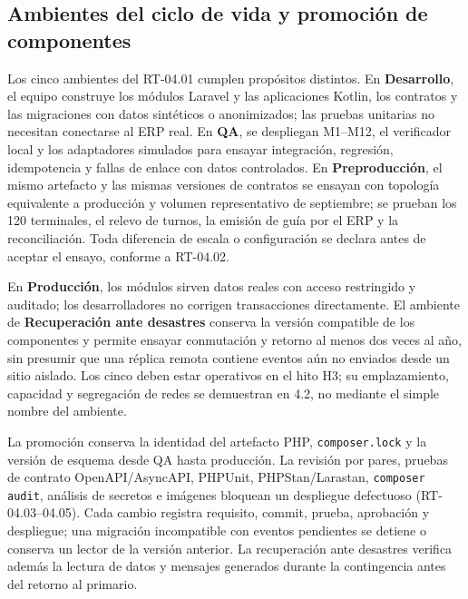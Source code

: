 \subsection{Ambientes del ciclo de vida y promoción de componentes}

Los cinco ambientes del RT-04.01 cumplen propósitos distintos. En \textbf{Desarrollo}, el equipo construye los módulos Laravel y las aplicaciones Kotlin, los contratos y las migraciones con datos sintéticos o anonimizados; las pruebas unitarias no necesitan conectarse al ERP real. En \textbf{QA}, se despliegan M1--M12, el verificador local y los adaptadores simulados para ensayar integración, regresión, idempotencia y fallas de enlace con datos controlados. En \textbf{Preproducción}, el mismo artefacto y las mismas versiones de contratos se ensayan con topología equivalente a producción y volumen representativo de septiembre; se prueban los 120 terminales, el relevo de turnos, la emisión de guía por el ERP y la reconciliación. Toda diferencia de escala o configuración se declara antes de aceptar el ensayo, conforme a RT-04.02.

En \textbf{Producción}, los módulos sirven datos reales con acceso restringido y auditado; los desarrolladores no corrigen transacciones directamente. El ambiente de \textbf{Recuperación ante desastres} conserva la versión compatible de los componentes y permite ensayar conmutación y retorno al menos dos veces al año, sin presumir que una réplica remota contiene eventos aún no enviados desde un sitio aislado. Los cinco deben estar operativos en el hito H3; su emplazamiento, capacidad y segregación de redes se demuestran en 4.2, no mediante el simple nombre del ambiente.

La promoción conserva la identidad del artefacto PHP, \texttt{composer.lock} y la versión de esquema desde QA hasta producción. La revisión por pares, pruebas de contrato OpenAPI/AsyncAPI, PHPUnit, PHPStan/Larastan, \texttt{composer audit}, análisis de secretos e imágenes bloquean un despliegue defectuoso (RT-04.03--04.05). Cada cambio registra requisito, commit, prueba, aprobación y despliegue; una migración incompatible con eventos pendientes se detiene o conserva un lector de la versión anterior. La recuperación ante desastres verifica además la lectura de datos y mensajes generados durante la contingencia antes del retorno al primario.

